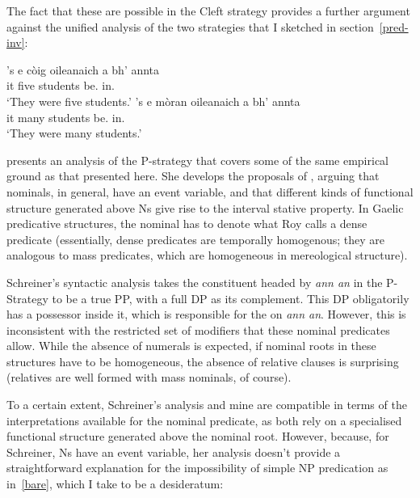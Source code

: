 \documentclass[output=paper]{langsci/langscibook}
\begin{document}
The fact that these  are possible in the Cleft strategy provides a further argument against the unified analysis of the two strategies that I sketched in section~\eqref{pred-inv}:

\ea {}
\ea \gll   's e c\`oig oileanaich a bh' annta\\
\Cop{} it five students \Rel{} be.\Prs{} in.\Tpl{}\\
\glt \enquote*{They were five students.}
\ex \gll  's e m\`oran oileanaich a bh' annta\\
\Cop{} it many students \Rel{} be.\Prs{} in.\Tpl{}\\
\glt \enquote*{They were many students.}
\z \z

\textcite{schreiner:15} presents an analysis of the P-strategy that covers
some of the same empirical ground as that presented here. She develops the
proposals of \textcite{roy:06}, arguing that nominals, in general, have an
event variable, and that different kinds of functional structure generated
above Ns give rise to the interval stative property. In Gaelic predicative
structures, the nominal has to denote what Roy calls a dense predicate
(essentially, dense predicates are temporally homogenous; they are analogous to
mass predicates, which are homogeneous in mereological structure).

Schreiner's syntactic analysis takes the constituent headed by \emph{ann an} in
the P-Strategy to be a true PP, with a full DP as its complement. This DP
obligatorily has a possessor inside it, which is responsible for the 
on \emph{ann an}. However, this is inconsistent with the restricted
set of modifiers that these nominal predicates allow. While the absence of
numerals is expected, if nominal roots in these structures have to be
homogeneous, the absence of relative clauses is surprising (relatives are well
formed with mass nominals, of course).

To a certain extent, Schreiner's  analysis and mine are compatible in terms of
the interpretations available for the nominal predicate, as both rely on a
specialised functional structure generated above the nominal root. However,
because, for Schreiner, Ns have an event variable, her analysis  doesn't
provide a straightforward explanation for the impossibility of simple NP
predication as in~\eqref{bare}, which I take to be a desideratum:

\ea {}
    \label{bare}
\z
\end{document}
